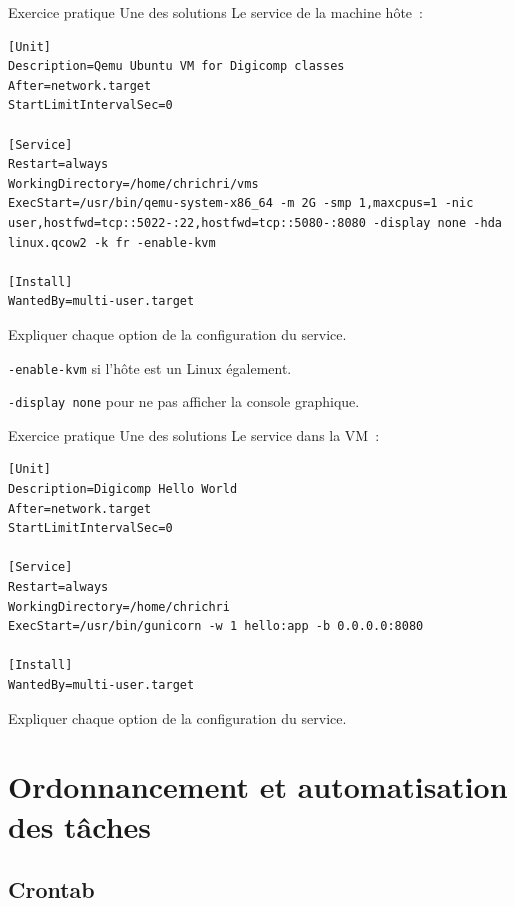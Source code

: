 \documentclass{beamer}
\begin{document}
    \begin{frame}[fragile]{Exercice pratique \execcounterdispinc{}}{Une des solutions}
        Le service de la machine hôte~:
        \begin{lstlisting}
[Unit]
Description=Qemu Ubuntu VM for Digicomp classes
After=network.target
StartLimitIntervalSec=0

[Service]
Restart=always
WorkingDirectory=/home/chrichri/vms
ExecStart=/usr/bin/qemu-system-x86_64 -m 2G -smp 1,maxcpus=1 -nic user,hostfwd=tcp::5022-:22,hostfwd=tcp::5080-:8080 -display none -hda linux.qcow2 -k fr -enable-kvm

[Install]
WantedBy=multi-user.target
        \end{lstlisting}
        Expliquer chaque option de la configuration du service.
        \pause
        \begin{dangercolorbox}
            \lstinline{-enable-kvm} si l'hôte est un Linux également.

            \lstinline{-display none} pour ne pas afficher la console graphique.
        \end{dangercolorbox}
    \end{frame}

    \begin{frame}[fragile]{Exercice pratique \execcounterdispinc{}}{Une des solutions}
        Le service dans la VM~:
        \begin{lstlisting}
[Unit]
Description=Digicomp Hello World
After=network.target
StartLimitIntervalSec=0

[Service]
Restart=always
WorkingDirectory=/home/chrichri
ExecStart=/usr/bin/gunicorn -w 1 hello:app -b 0.0.0.0:8080

[Install]
WantedBy=multi-user.target
        \end{lstlisting}
        Expliquer chaque option de la configuration du service.
    \end{frame}


    \section{Ordonnancement et automatisation des tâches}\label{sec:scheduling}

    \subsection{Crontab}\label{subsec:crontab}
\end{document}
